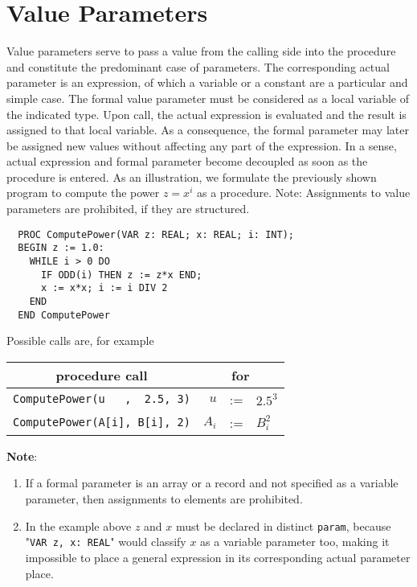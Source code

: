 \section{Value Parameters}
Value parameters serve to pass a value from the calling side into the procedure and constitute the
predominant case of parameters. The corresponding actual parameter is an expression, of which a
variable or a constant are a particular and simple case. The formal value parameter must be
considered as a local variable of the indicated type. Upon call, the actual expression is evaluated
and the result is assigned to that local variable. As a consequence, the formal parameter may later
be assigned new values without affecting any part of the expression. In a sense, actual expression
and formal parameter become decoupled as soon as the procedure is entered. As an illustration,
we formulate the previously shown program to compute the power $z = x^i$ as a procedure. Note:
Assignments to value parameters are prohibited, if they are structured.
\begin{verbatim}
  PROC ComputePower(VAR z: REAL; x: REAL; i: INT);
  BEGIN z := 1.0:
    WHILE i > 0 DO
      IF ODD(i) THEN z := z*x END;
      x := x*x; i := i DIV 2
    END
  END ComputePower
\end{verbatim}
Possible calls are, for example
\begin{table}[h!]
  \centering
  \begin{tabular}{c|rll}
    procedure call & \multicolumn{3}{c}{for} \\\hline
    \verb|ComputePower(u   ,  2.5, 3)| &   $u$&:=&$2.5^3$ \\
    \verb|ComputePower(A[i], B[i], 2)| & $A_i$&:=&$B_i^2$ \\
  \end{tabular}
\end{table}

\textbf{Note}:
\begin{enumerate}
  \item If a formal parameter is an array or a record and not specified as a variable parameter,
    then assignments to elements are prohibited.
  \item In the example above $z$ and $x$ must be declared in distinct \verb|param|, because
    "\verb|VAR z, x: REAL|" would classify $x$ as a variable parameter too, making it impossible
    to place a general expression in its corresponding actual parameter place.
\end{enumerate}

